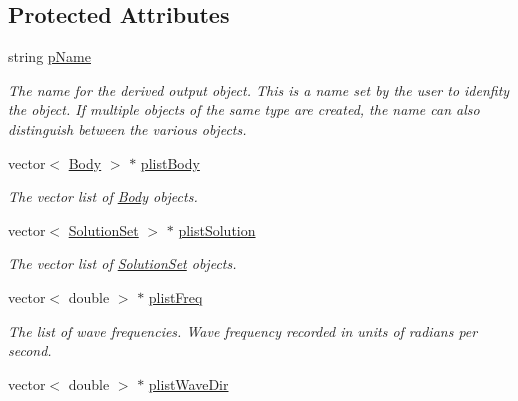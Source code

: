 \subsection*{Protected Attributes}
\begin{DoxyCompactItemize}
\item 
\hypertarget{class_output_derived_a54e3e1356bd379db875c0ce8ee223ef6}{string \hyperlink{class_output_derived_a54e3e1356bd379db875c0ce8ee223ef6}{p\-Name}}\label{class_output_derived_a54e3e1356bd379db875c0ce8ee223ef6}

\begin{DoxyCompactList}\small\item\em The name for the derived output object. This is a name set by the user to idenfity the object. If multiple objects of the same type are created, the name can also distinguish between the various objects. \end{DoxyCompactList}\item 
\hypertarget{class_output_derived_a584a7b228dfc4ea3830631763e0a36fa}{vector$<$ \hyperlink{class_body}{Body} $>$ $\ast$ \hyperlink{class_output_derived_a584a7b228dfc4ea3830631763e0a36fa}{plist\-Body}}\label{class_output_derived_a584a7b228dfc4ea3830631763e0a36fa}

\begin{DoxyCompactList}\small\item\em The vector list of \hyperlink{class_body}{Body} objects. \end{DoxyCompactList}\item 
\hypertarget{class_output_derived_a9d9db93854507b677f78301376438415}{vector$<$ \hyperlink{class_solution_set}{Solution\-Set} $>$ $\ast$ \hyperlink{class_output_derived_a9d9db93854507b677f78301376438415}{plist\-Solution}}\label{class_output_derived_a9d9db93854507b677f78301376438415}

\begin{DoxyCompactList}\small\item\em The vector list of \hyperlink{class_solution_set}{Solution\-Set} objects. \end{DoxyCompactList}\item 
\hypertarget{class_output_derived_a2c367aa51c34c8eb43dc226be92c3d07}{vector$<$ double $>$ $\ast$ \hyperlink{class_output_derived_a2c367aa51c34c8eb43dc226be92c3d07}{plist\-Freq}}\label{class_output_derived_a2c367aa51c34c8eb43dc226be92c3d07}

\begin{DoxyCompactList}\small\item\em The list of wave frequencies. Wave frequency recorded in units of radians per second. \end{DoxyCompactList}\item 
\hypertarget{class_output_derived_a10727e0eabf2b6f22940cb2c9f510772}{vector$<$ double $>$ $\ast$ \hyperlink{class_output_derived_a10727e0eabf2b6f22940cb2c9f510772}{plist\-Wave\-Dir}}\label{class_output_derived_a10727e0eabf2b6f22940cb2c9f510772}


\end{DoxyCompactItemize}
